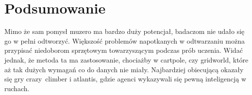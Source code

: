 \section{Podsumowanie}
    Mimo że sam pomysł muzero ma bardzo duży potencjał, badaczom nie udało się go w pełni odtworzyć. Większość problemów napotkanych w odtwarzaniu można przypisać niedoborom sprzętowym towarzyszącym podczas prób uczenia. 
    Widać jednak, że metoda ta ma zastosowanie, chociażby w cartpole, czy gridworld, które aż tak dużych wymagań co do danych nie miały. Najbardziej obiecującą okazały się gry crazy~climber i atlantis, gdzie agenci wykazywali się pewną inteligencją w ruchach.